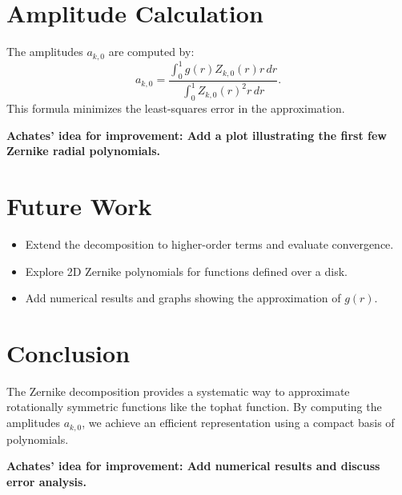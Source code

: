 \documentclass[12pt]{article}
\begin{document}
\section{Amplitude Calculation}
The amplitudes \( a_{k,0} \) are computed by:
\begin{equation}
a_{k,0} = \frac{\int_{0}^{1} g(r) Z_{k,0}(r) r \, dr}{\int_{0}^{1} Z_{k,0}(r)^2 r \, dr}.
\end{equation}
This formula minimizes the least-squares error in the approximation.

\begin{center}
\textbf{Achates' idea for improvement: Add a plot illustrating the first few Zernike radial polynomials.}
\end{center}

\section{Future Work}
\begin{itemize}
    \item Extend the decomposition to higher-order terms and evaluate convergence.
    \item Explore 2D Zernike polynomials for functions defined over a disk.
    \item Add numerical results and graphs showing the approximation of \( g(r) \).
\end{itemize}

\section{Conclusion}
The Zernike decomposition provides a systematic way to approximate rotationally symmetric functions like the tophat function. By computing the amplitudes \( a_{k,0} \), we achieve an efficient representation using a compact basis of polynomials.

\begin{center}
\textbf{Achates' idea for improvement: Add numerical results and discuss error analysis.}
\end{center}
\end{document}
